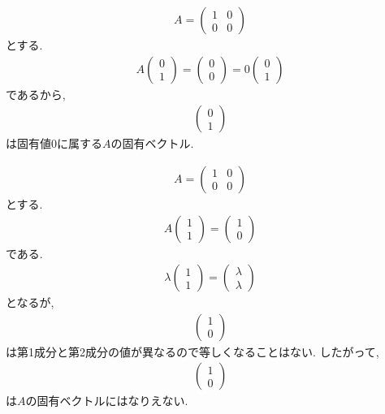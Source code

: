 \begin{example}
  \begin{align*}
    A=\begin{pmatrix}1&0\\0&0\end{pmatrix}
  \end{align*}
  とする.
  \begin{align*}
    A\begin{pmatrix}0\\1\end{pmatrix}=\begin{pmatrix}0\\0\end{pmatrix}=0\begin{pmatrix}0\\1\end{pmatrix}
  \end{align*}
  であるから,
  \begin{align*}
    \begin{pmatrix}0\\1\end{pmatrix}
  \end{align*}
  は固有値$0$に属する$A$の固有ベクトル.
\end{example}


\begin{example}
  \begin{align*}
    A=\begin{pmatrix}1&0\\0&0\end{pmatrix}
  \end{align*}
  とする.
  \begin{align*}
    A\begin{pmatrix}1\\1\end{pmatrix}=\begin{pmatrix}1\\0\end{pmatrix}
  \end{align*}
  である.
  \begin{align*}
    \lambda\begin{pmatrix}1\\1\end{pmatrix}=\begin{pmatrix}\lambda\\\lambda\end{pmatrix}
  \end{align*}
  となるが,
  \begin{align*}
    \begin{pmatrix}1\\0\end{pmatrix}
  \end{align*}
  は第1成分と第2成分の値が異なるので等しくなることはない.
  したがって,
  \begin{align*}
    \begin{pmatrix}1\\0\end{pmatrix}
  \end{align*}
  は$A$の固有ベクトルにはなりえない.
\end{example}

